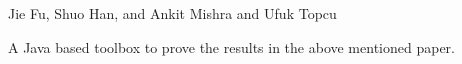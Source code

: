 Jie Fu, Shuo Han, and Ankit Mishra and Ufuk Topcu

A Java based toolbox to prove the results in the above mentioned paper. 